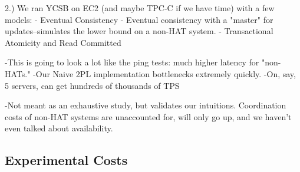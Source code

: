 2.) We ran YCSB on EC2 (and maybe TPC-C if we have time) with a few models:
	- Eventual Consistency
	- Eventual consistency with a "master" for updates--simulates the lower bound on a non-HAT system.
	- Transactional Atomicity and Read Committed
	
	-This is going to look a lot like the ping tests: much higher latency for "non-HATs."
	-Our Naive 2PL implementation bottlenecks extremely quickly.
	-On, say, 5 servers, can get hundreds of thousands of TPS

	-Not meant as an exhaustive study, but validates our intuitions. Coordination costs of non-HAT systems are unaccounted for, will only go up, and we haven't even talked about availability.

\subsection{Experimental Costs}



